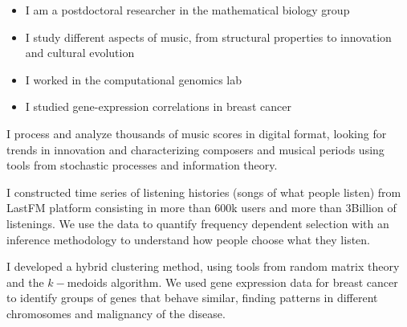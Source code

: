 \documentclass[10pt,a4paper,ragged2e,withhyper]{altacv}
\begin{document}
\begin{paracol}{2}

\begin{itemize}
\item I am a postdoctoral researcher in the mathematical biology group
\item I study different aspects of music, from structural properties to innovation and cultural evolution
\end{itemize}

\divider

\begin{itemize}
\item I worked in the computational genomics lab
\item I studied gene-expression correlations in breast cancer
\end{itemize}


I process and analyze thousands of music scores in digital format, looking for trends in innovation and characterizing composers and musical periods using tools from stochastic processes and information theory.


\divider


I constructed time series of listening histories (songs of what people listen) from LastFM platform consisting in more than 600k users and more than 3Billion of listenings. We use the data to quantify frequency dependent selection with an inference methodology to understand how people choose what they listen.

\divider

I developed a hybrid clustering method, using tools from random matrix theory and the $k-$medoids algorithm. We used gene expression data for breast cancer to identify groups of genes that behave similar, finding patterns in different chromosomes and malignancy of the disease.


\end{paracol}
\end{document}
